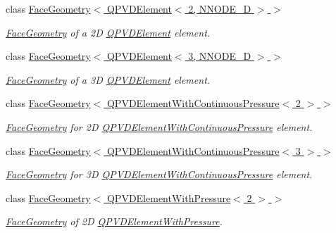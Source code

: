 \begin{DoxyCompactItemize}
class \hyperlink{classoomph_1_1FaceGeometry_3_01QPVDElement_3_012_00_01NNODE__1D_01_4_01_4}{Face\+Geometry$<$ Q\+P\+V\+D\+Element$<$ 2, N\+N\+O\+D\+E\+\_\+D $>$ $>$}
\begin{DoxyCompactList}\small\item\em \hyperlink{classoomph_1_1FaceGeometry}{Face\+Geometry} of a 2D \hyperlink{classoomph_1_1QPVDElement}{Q\+P\+V\+D\+Element} element. \end{DoxyCompactList}\item 
class \hyperlink{classoomph_1_1FaceGeometry_3_01QPVDElement_3_013_00_01NNODE__1D_01_4_01_4}{Face\+Geometry$<$ Q\+P\+V\+D\+Element$<$ 3, N\+N\+O\+D\+E\+\_\+D $>$ $>$}
\begin{DoxyCompactList}\small\item\em \hyperlink{classoomph_1_1FaceGeometry}{Face\+Geometry} of a 3D \hyperlink{classoomph_1_1QPVDElement}{Q\+P\+V\+D\+Element} element. \end{DoxyCompactList}\item 
class \hyperlink{classoomph_1_1FaceGeometry_3_01QPVDElementWithContinuousPressure_3_012_01_4_01_4}{Face\+Geometry$<$ Q\+P\+V\+D\+Element\+With\+Continuous\+Pressure$<$ 2 $>$ $>$}
\begin{DoxyCompactList}\small\item\em \hyperlink{classoomph_1_1FaceGeometry}{Face\+Geometry} for 2D \hyperlink{classoomph_1_1QPVDElementWithContinuousPressure}{Q\+P\+V\+D\+Element\+With\+Continuous\+Pressure} element. \end{DoxyCompactList}\item 
class \hyperlink{classoomph_1_1FaceGeometry_3_01QPVDElementWithContinuousPressure_3_013_01_4_01_4}{Face\+Geometry$<$ Q\+P\+V\+D\+Element\+With\+Continuous\+Pressure$<$ 3 $>$ $>$}
\begin{DoxyCompactList}\small\item\em \hyperlink{classoomph_1_1FaceGeometry}{Face\+Geometry} for 3D \hyperlink{classoomph_1_1QPVDElementWithContinuousPressure}{Q\+P\+V\+D\+Element\+With\+Continuous\+Pressure} element. \end{DoxyCompactList}\item 
class \hyperlink{classoomph_1_1FaceGeometry_3_01QPVDElementWithPressure_3_012_01_4_01_4}{Face\+Geometry$<$ Q\+P\+V\+D\+Element\+With\+Pressure$<$ 2 $>$ $>$}
\begin{DoxyCompactList}\small\item\em \hyperlink{classoomph_1_1FaceGeometry}{Face\+Geometry} of 2D \hyperlink{classoomph_1_1QPVDElementWithPressure}{Q\+P\+V\+D\+Element\+With\+Pressure}. \end{DoxyCompactList}\item 

\end{DoxyCompactItemize}
